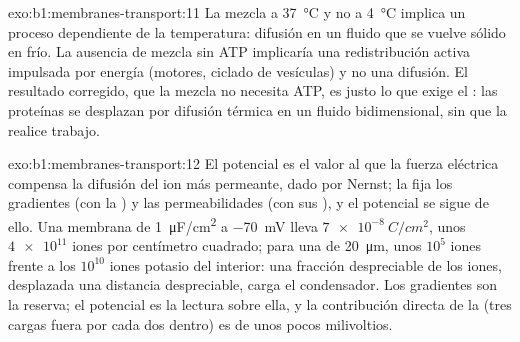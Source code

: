\begin{solution}{exo:b1:membranes-transport:11}
La mezcla a \qty{37}{\celsius} y no a \qty{4}{\celsius} implica un proceso
dependiente de la temperatura: difusión en un fluido que se vuelve sólido en
frío. La ausencia de mezcla sin ATP implicaría una redistribución activa
impulsada por energía (motores, ciclado de vesículas) y no una difusión. El
resultado corregido, que la mezcla no necesita ATP, es justo lo que exige el
: las proteínas se desplazan por difusión térmica
en un fluido bidimensional, sin que la  realice trabajo.
\end{solution}

\begin{solution}{exo:b1:membranes-transport:12}
El potencial es el valor al que la fuerza eléctrica compensa la difusión del
ion más permeante, dado por Nernst; la  fija los gradientes (con la
) y las permeabilidades (con sus ), y el potencial se sigue de
ello. Una membrana de \qty{1}{\micro F/cm^2} a \qty{-70}{mV} lleva
$\qty{7e-8}{C/cm^2}$, unos $\num{4e11}$ iones por centímetro cuadrado; para
una  de \qty{20}{\micro m}, unos $10^5$ iones frente a los $10^{10}$
iones potasio del interior: una fracción despreciable de los iones,
desplazada una distancia despreciable, carga el condensador. Los gradientes
son la reserva; el potencial es la lectura sobre ella, y la contribución
directa de la  (tres cargas fuera por cada dos dentro) es de unos pocos
milivoltios.
\end{solution}

